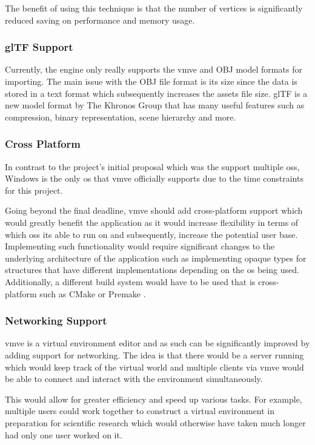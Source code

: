 \documentclass[11pt]{article}
\begin{document}
The benefit of using this technique is that the number of vertices is
significantly reduced saving on performance and memory usage.


\subsubsection{glTF Support}
Currently, the engine only really supports the \gls*{vmve} and OBJ model formats for
importing. The main issue with the OBJ file format is its size since the data is
stored in a text format which subsequently increases the assets file size. glTF
\cite{gltf} is a new model format by The Khronos Group that has many useful
features such as compression, binary representation, scene hierarchy and more.

\subsubsection{Cross Platform}
In contrast to the project's initial proposal which was the support multiple
\glspl*{os}, Windows is the only \gls*{os} that \gls*{vmve} officially supports due
to the time constraints for this project. 

Going beyond the final deadline, \gls*{vmve} should add cross-platform support
which would greatly benefit the application as it would increase flexibility in
terms of which \glspl*{os} its able to run on and subsequently, increase the
potential user base. Implementing such functionality would require significant
changes to the underlying architecture of the application such as implementing
opaque types for structures that have different implementations depending on the
\gls*{os} being used. Additionally, a different build system would have to be
used that is cross-platform such as CMake \cite{cmake} or Premake \cite{premake}.

\subsubsection{Networking Support}
\gls*{vmve} is a virtual environment editor and as such can be significantly
improved by adding support for networking. The idea is that there would be a
server running which would keep track of the virtual world and multiple clients
via \gls*{vmve} would be able to connect and interact with the environment
simultaneously.

This would allow for greater efficiency and speed up various tasks. For example,
multiple users could work together to construct a virtual environment in
preparation for scientific research which would otherwise have taken much longer
had only one user worked on it.
\end{document}

